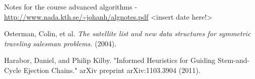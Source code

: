 \documentclass[paper=a4, fontsize=11pt,numbers=endperiod]{scrartcl} %
\numberwithin{equation}{section} %
\numberwithin{figure}{section} %
\numberwithin{table}{section} %
\begin{document}
\newpage
\begin{thebibliography}{9}

 Notes for the course advanced algorithms - \url{http://www.nada.kth.se/~johanh/algnotes.pdf} <insert date here!>
 
 Osterman, Colin, et al. \emph{The satellite list and new data structures for symmetric traveling salesman problems.} (2004).

 Harabor, Daniel, and Philip Kilby. "Informed Heuristics for Guiding Stem-and-Cycle Ejection Chains." arXiv preprint arXiv:1103.3904 (2011).
\end{thebibliography}
\end{document}
